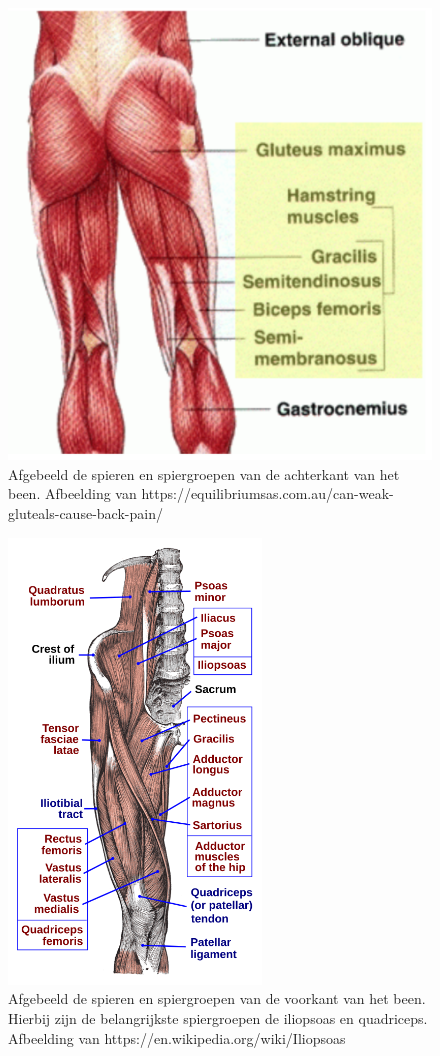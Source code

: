 \documentclass{article}
\begin{document}
\begin{figure}
    \centering
    \includegraphics[width=\textwidth]{figures/muscles.png}
    \caption{Afgebeeld de spieren en spiergroepen van de achterkant van het been. Afbeelding van https://equilibriumsas.com.au/can-weak-gluteals-cause-back-pain/}
    \label{fig:muscles}
\end{figure}

\begin{figure}
    \centering
    \includegraphics[width=0.6\textwidth]{figures/upper leg.png}
    \caption{Afgebeeld de spieren en spiergroepen van de voorkant van het been. Hierbij zijn de belangrijkste spiergroepen de iliopsoas en quadriceps. Afbeelding van https://en.wikipedia.org/wiki/Iliopsoas}
    \label{fig:upper leg}
\end{figure}
\end{document}
